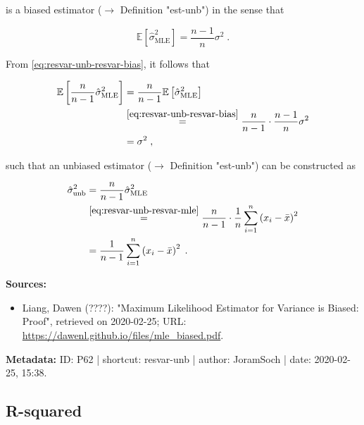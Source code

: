 \documentclass[a4paper,12pt]{book}
\begin{document}
is a biased estimator ($\rightarrow$ Definition "est-unb") in the sense that

\begin{equation} \label{eq:resvar-unb-resvar-bias}
\mathbb{E}\left[ \hat{\sigma}^2_{\mathrm{MLE}} \right] = \frac{n-1}{n} \sigma^2 \; .
\end{equation}

From \eqref{eq:resvar-unb-resvar-bias}, it follows that

\begin{equation} \label{eq:resvar-unb-resvar-bias-adj}
\begin{split}
\mathbb{E}\left[ \frac{n}{n-1} \hat{\sigma}^2_{\mathrm{MLE}} \right] &= \frac{n}{n-1} \mathbb{E}\left[ \hat{\sigma}^2_{\mathrm{MLE}} \right] \\
&\overset{\eqref{eq:resvar-unb-resvar-bias}}{=} \frac{n}{n-1} \cdot \frac{n-1}{n} \sigma^2 \\
&= \sigma^2 \; ,
\end{split}
\end{equation}

such that an unbiased estimator ($\rightarrow$ Definition "est-unb") can be constructed as

\begin{equation} \label{eq:resvar-unb-resvar-unb-qed}
\begin{split}
\hat{\sigma}^2_{\mathrm{unb}} &= \frac{n}{n-1} \hat{\sigma}^2_{\mathrm{MLE}} \\
&\overset{\eqref{eq:resvar-unb-resvar-mle}}{=} \frac{n}{n-1} \cdot \frac{1}{n} \sum_{i=1}^{n} \left( x_i - \bar{x} \right)^2 \\
&= \frac{1}{n-1} \sum_{i=1}^{n} \left( x_i - \bar{x} \right)^2 \; .
\end{split}
\end{equation}

\vspace{1em}
\textbf{Sources:}
\begin{itemize}
\item Liang, Dawen (????): "Maximum Likelihood Estimator for Variance is Biased: Proof", retrieved on 2020-02-25; URL: \url{https://dawenl.github.io/files/mle_biased.pdf}.
\end{itemize}


\vspace{1em}
\textbf{Metadata:} ID: P62 | shortcut: resvar-unb | author: JoramSoch | date: 2020-02-25, 15:38.


\subsection{R-squared}
\end{document}
